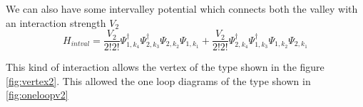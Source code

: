 \documentclass[a4paper,crop=false]{standalone}
\begin{document}
We can also have some intervalley potential which connects both the valley with an interaction strength $V_2$
        \begin{equation}
            H_{intval} = \frac{V_2}{2!2!} \Psi^{\dagger}_{1,k_4}\Psi^{\dagger}_{2,k_3}\Psi_{2,k_2}\Psi_{1,k_1} + \frac{V_2}{2!2!} \Psi^{\dagger}_{2,k_4}\Psi^{\dagger}_{1,k_3}\Psi_{1,k_2}\Psi_{2,k_1}
        \end{equation}

        This kind of interaction allows the vertex of the type shown in the figure \ref{fig:vertex2}. This allowed the one loop diagrams of the type shown in \ref{fig:oneloopv2}
        \begin{figure*}[h]
            
        \caption{one loop diagrams with new interaction}
        \label{fig:oneloopv2}
        \end{figure*}
\end{document}
